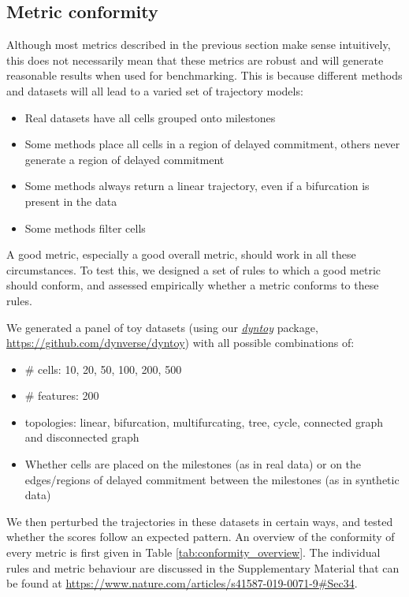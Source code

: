 
\subsection{Metric conformity}

Although most metrics described in the previous section make sense intuitively, this does not necessarily mean that these metrics are robust and will generate reasonable results when used for benchmarking. This is because different methods and datasets will all lead to a varied set of trajectory models:

\begin{itemize}
	\item Real datasets have all cells grouped onto milestones
	\item Some methods place all cells in a region of delayed commitment, others never generate a region of delayed commitment
	\item Some methods always return a linear trajectory, even if a bifurcation is present in the data
	\item Some methods filter cells
\end{itemize}

A good metric, especially a good overall metric, should work in all these circumstances. To test this, we designed a set of rules to which a good metric should conform, and assessed empirically whether a metric conforms to these rules.

We generated a panel of toy datasets (using our \href{https://github.com/dynverse/dyntoy}{\textit{dyntoy}} package, \href{https://github.com/dynverse/dyntoy}{https://github.com/dynverse/dyntoy}) with all possible combinations of:

\begin{itemize}
	\item \# cells: 10, 20, 50, 100, 200, 500
	\item \# features: 200
	\item topologies: linear, bifurcation, multifurcating, tree, cycle, connected graph and disconnected graph
	\item Whether cells are placed on the milestones (as in real data) or on the edges/regions of delayed commitment between the milestones (as in synthetic data)
\end{itemize}

We then perturbed the trajectories in these datasets in certain ways, and tested whether the scores follow an expected pattern. An overview of the conformity of every metric is first given in Table \ref{tab:conformity_overview}. The individual rules and metric behaviour are discussed in the Supplementary Material that can be found at \href{https://www.nature.com/articles/s41587-019-0071-9\#Sec34}{https://www.nature.com/articles/s41587-019-0071-9\#Sec34}.

